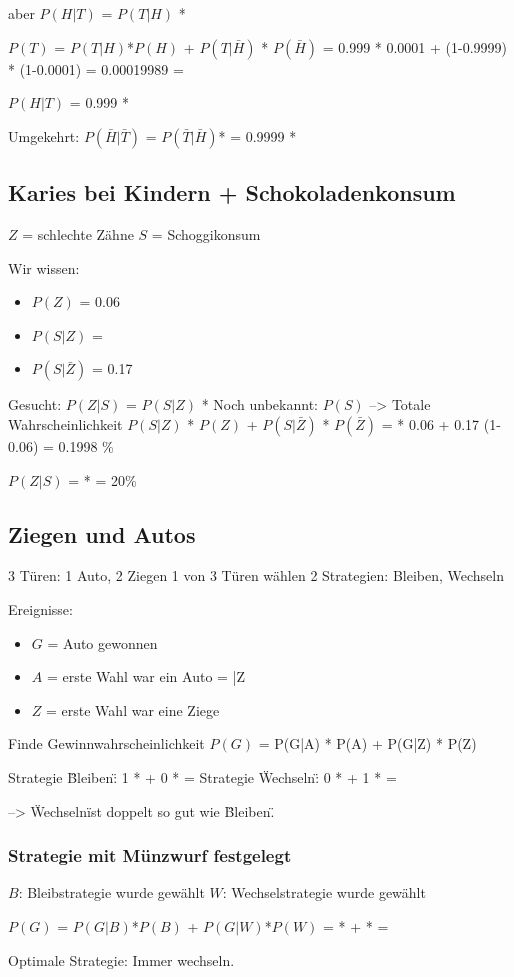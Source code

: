 \documentclass[10pt,a4paper]{scrartcl}
\begin{document}
aber $P(H|T)$ = $P(T|H)$ * 

$P(T)$ = $P(T|H)$*$P(H)$ + $P(T|\bar{H})$ * $P(\bar{H})$
	 = 0.999 * 0.0001 + (1-0.9999) * (1-0.0001)
	 = 0.00019989 = 

$P(H|T)$ = 0.999 *  


Umgekehrt:
$P(\bar{H}|\bar{T})$ = $P(\bar{T}|\bar{H})$*
 = 0.9999 *  

\subsection{Karies bei Kindern + Schokoladenkonsum}
$Z$ = {schlechte Zähne}
$S$ = {Schoggikonsum}

Wir wissen:
\begin{itemize}
\item $P(Z)$ = 0.06
\item $P(S|Z)$ = 
\item $P(S|\bar{Z})$ = 0.17
\end{itemize}

Gesucht: $P(Z|S)$ = $P(S|Z)$ * 
Noch unbekannt: $P(S)$ --> Totale Wahrscheinlichkeit $P(S|Z)$ * $P(Z)$ + $P(S|\bar{Z})$ * $P(\bar{Z})$
 =  * 0.06 + 0.17 (1-0.06) = 0.1998 \%

 $P(Z|S)$ =  *  = 20\%


\subsection{Ziegen und Autos}
3 Türen: 1 Auto, 2 Ziegen
1 von 3 Türen wählen
2 Strategien: Bleiben, Wechseln

Ereignisse:
\begin{itemize}
\item $G$ = {Auto gewonnen}
\item $A$ = {erste Wahl war ein Auto} = \bar{Z}
\item $Z$ = {erste Wahl war eine Ziege}
\end{itemize}

Finde Gewinnwahrscheinlichkeit
$P(G)$ = P(G|A) * P(A) + P(G|Z) * P(Z)

Strategie \"Bleiben\": 1 *  + 0 *  = 
Strategie \"Wechseln\": 0 *  + 1 *  = 

--> \"Wechseln\" ist doppelt so gut wie \"Bleiben\".

\subsubsection{Strategie mit Münzwurf festgelegt}
$B$: Bleibstrategie wurde gewählt
$W$: Wechselstrategie wurde gewählt

$P(G)$ = $P(G|B)$*$P(B)$ + $P(G|W)$*$P(W)$
	= * + * = 

Optimale Strategie: Immer wechseln.
\end{document}
